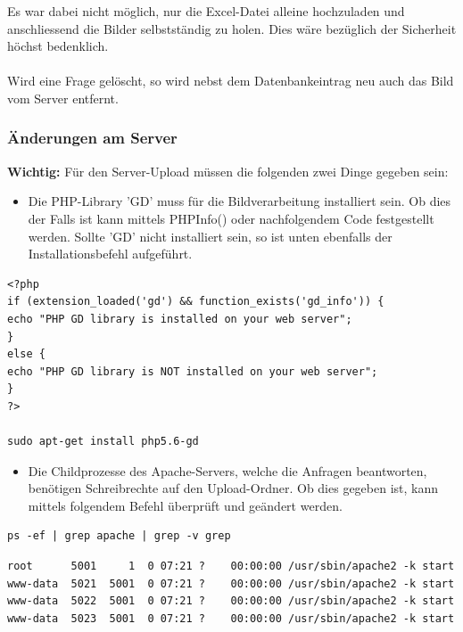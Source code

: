 Es war dabei nicht möglich, nur die Excel-Datei alleine hochzuladen und anschliessend die Bilder selbstständig zu holen. Dies wäre bezüglich der Sicherheit höchst bedenklich.
\\
\\
Wird eine Frage gelöscht, so wird nebst dem Datenbankeintrag neu auch das Bild vom Server entfernt.


\subsubsection{Änderungen am Server}
\textbf{Wichtig:} 
Für den Server-Upload müssen die folgenden zwei Dinge gegeben sein:
\begin{itemize}
	\item Die PHP-Library 'GD' muss für die Bildverarbeitung installiert sein. Ob dies der Falls ist kann mittels PHPInfo() oder nachfolgendem Code festgestellt werden. \cite{zoopable.com} Sollte 'GD' nicht installiert sein, so ist unten ebenfalls der Installationsbefehl aufgeführt. \cite{askubuntu.com_php_extension}
\end{itemize}
\begin{lstlisting}
<?php
if (extension_loaded('gd') && function_exists('gd_info')) {
echo "PHP GD library is installed on your web server";
}
else {
echo "PHP GD library is NOT installed on your web server";
}
?>

sudo apt-get install php5.6-gd
\end{lstlisting}

\begin{itemize}
	\item Die Childprozesse des Apache-Servers, welche die Anfragen beantworten, benötigen Schreibrechte auf den Upload-Ordner. Ob dies gegeben ist, kann mittels folgendem Befehl überprüft und geändert werden. \cite{askubuntu.com_permissions} 
\end{itemize}
\begin{lstlisting}
ps -ef | grep apache | grep -v grep
\end{lstlisting}

\begin{lstlisting}
root      5001     1  0 07:21 ?    00:00:00 /usr/sbin/apache2 -k start
www-data  5021  5001  0 07:21 ?    00:00:00 /usr/sbin/apache2 -k start
www-data  5022  5001  0 07:21 ?    00:00:00 /usr/sbin/apache2 -k start
www-data  5023  5001  0 07:21 ?    00:00:00 /usr/sbin/apache2 -k start
\end{lstlisting}

